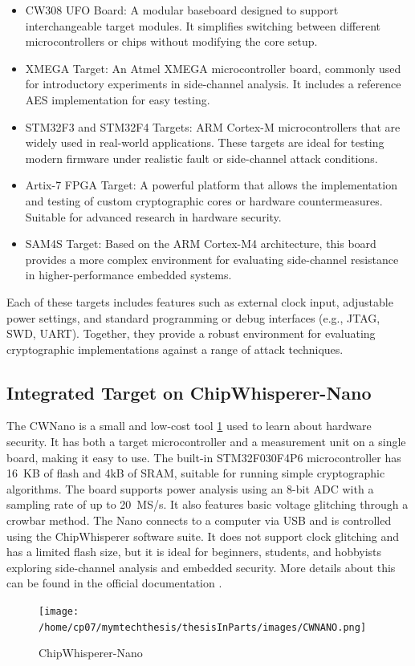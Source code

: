\begin{itemize}
    \item CW308 UFO Board: A modular baseboard \cite{newae_cw308ufo} designed to support interchangeable target modules. It simplifies switching between different microcontrollers or chips without modifying the core setup.
    
    \item XMEGA Target: An Atmel XMEGA microcontroller board, commonly used for introductory experiments in side-channel analysis. It includes a reference AES implementation for easy testing.
    
    \item STM32F3 and STM32F4 Targets: ARM Cortex-M microcontrollers that are widely used in real-world applications. These targets are ideal for testing modern firmware under realistic fault or side-channel attack conditions.
    
    \item Artix-7 FPGA Target: A powerful platform \cite{newae_cw305} that allows the implementation and testing of custom cryptographic cores or hardware countermeasures. Suitable for advanced research in hardware security.
    
    \item SAM4S Target: Based on the ARM Cortex-M4 architecture, this board provides a more complex environment for evaluating side-channel resistance in higher-performance embedded systems.
\end{itemize}

Each of these targets includes features such as external clock input, adjustable power settings, and standard programming or debug interfaces (e.g., JTAG, SWD, UART). Together, they provide a robust environment for evaluating cryptographic implementations against a range of attack techniques.



\subsection{Integrated Target on ChipWhisperer-Nano}
The CWNano is a small and low-cost tool \ref{fig:nano_target} used to learn about hardware security. It has both a target microcontroller and a measurement unit on a single board, making it easy to use. The built-in STM32F030F4P6 microcontroller has 16~KB of flash and 4kB of SRAM, suitable for running simple cryptographic algorithms. The board supports power analysis using an 8-bit ADC with a sampling rate of up to 20~MS/s. It also features basic voltage glitching through a crowbar method. The Nano connects to a computer via USB and is controlled using the ChipWhisperer software suite. It does not support clock glitching and has a limited flash size, but it is ideal for beginners, students, and hobbyists exploring side-channel analysis and embedded security. More details about this can be found in the official documentation \cite{chipwhisperer_nano}.
\begin{figure}[h]
    \centering
    \texttt{[image: /home/cp07/mymtechthesis/thesisInParts/images/CWNANO.png]}
    \caption{ChipWhisperer-Nano}
    \label{fig:nano_target}
\end{figure}



